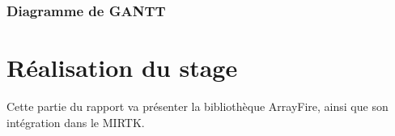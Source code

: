 \documentclass[10pt]{report}
\begin{document}
	\subsection{Diagramme de GANTT}
\chapter{Réalisation du stage} %
Cette partie du rapport va présenter la bibliothèque ArrayFire, ainsi que son intégration dans le MIRTK.
\end{document}
